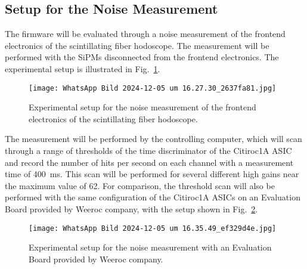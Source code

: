 \subsection{Setup for the Noise Measurement}
The firmware will be evaluated through a noise measurement of the frontend electronics of the scintillating fiber hodoscope. 
The measurement will be performed with the SiPMs disconnected from the frontend electronics. 
The experimental setup is illustrated in Fig.~\ref{fig:noise_setup}.
\begin{figure}[H]
    \centering
    \texttt{[image: WhatsApp Bild 2024-12-05 um 16.27.30\_2637fa81.jpg]}%
    \caption{Experimental setup for the noise measurement of the frontend electronics of the scintillating fiber hodoscope.}
    \label{fig:noise_setup}
\end{figure}
The measurement will be performed by the controlling computer, 
which will scan through a range of thresholds of the time discriminator of the Citiroc1A ASIC and record the number of hits per second on each channel with a measurement time of \SI{400}{\milli\second}.
This scan will be performed for several different high gains near the maximum value of 62.
\newline
For comparison, the threshold scan will also be performed with the same configuration of the Citiroc1A ASICs on an Evaluation Board provided by Weeroc company, 
with the setup shown in Fig.~\ref{fig:noise_setup_testboard}.
\begin{figure}[H]
    \centering
    \texttt{[image: WhatsApp Bild 2024-12-05 um 16.35.49\_ef329d4e.jpg]}%
    \caption{Experimental setup for the noise measurement with an Evaluation Board provided by Weeroc company.}
    \label{fig:noise_setup_testboard}
\end{figure}

